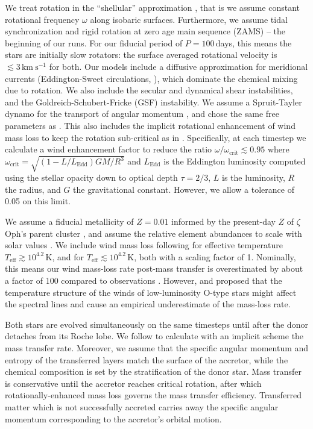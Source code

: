 \documentclass[twocolumn,twocolappendix,trackchanges]{aastex63}
\newcommand{\kms}{{\mathrm{km\ s^{-1}}}}
\newcommand{\zoph}{$\zeta$ Oph}
\begin{document}
We treat rotation in the ``shellular'' approximation
\citep[e.g.,][]{zahn:92, ekstrom:12}, that is we
assume constant rotational frequency $\omega$ along isobaric
surfaces. Furthermore, we assume tidal synchronization and rigid
rotation at zero age
main sequence (ZAMS) -- the beginning of our runs. For our fiducial
period of $P=100$\,days, this means the stars are initially slow
rotators: the surface averaged rotational velocity is
$\lesssim3\,\kms$ for both. Our models include a diffusive
approximation for meridional currents (Eddington-Sweet circulations, \citealt{sweet:50}), which
dominate the chemical mixing due to rotation. We also include the
secular and dynamical shear instabilities, and the
Goldreich-Schubert-Fricke (GSF) instability.  We assume a Spruit-Tayler
dynamo for the transport of angular momentum \citep{spruit:02}, and
chose the same free parameters as \cite{heger:00}. This also includes
the implicit rotational enhancement of wind mass loss to keep the
rotation sub-critical as in \cite{langer:98}. Specifically, at each
timestep we calculate a wind enhancement factor to reduce the ratio
$\omega/\omega_\mathrm{crit}\lesssim 0.95$ where
$\omega_\mathrm{crit}=\sqrt{(1-L/L_\mathrm{Edd})GM/R^3}$ and
$L_\mathrm{Edd}$ is the Eddington luminosity computed using the
stellar opacity down to optical depth
$\tau=2/3$, $L$ is the luminosity, $R$ the radius, and $G$
the gravitational constant. However, we allow a tolerance of 0.05 on
this limit.



We assume a fiducial metallicity of $Z=0.01$ informed by the
present-day $Z$ of \zoph's parent cluster \citep{murphy:21}, and assume
the relative element abundances to scale with solar values \citep{grevesse:98}. We include wind mass loss following
\cite{vink:00,vink:01} for effective
temperature $T_\mathrm{eff}\gtrsim10^{4.2}$\,K, and \cite{dejager:88} for  $T_\mathrm{eff}\lesssim10^{4.2}$\,K, both with a scaling
factor of 1. Nominally, this means our wind mass-loss rate post-mass
transfer is overestimated by about a factor of 100 compared to
observations \citep[weak wind problem, see][]{marcolino:09}.  However,
\cite{lucy:12} and \cite{lagae:21} proposed that the temperature
structure of the winds of low-luminosity O-type stars might affect the
spectral lines and cause an empirical underestimate of the mass-loss
rate.

Both stars are evolved simultaneously on the same timesteps until
after the donor detaches from its Roche lobe. We follow \cite{kolb:90}
to calculate with an implicit scheme the mass transfer rate. Moreover, we
assume that the specific angular momentum and entropy of the
transferred layers match the surface of the accretor, while the chemical composition
is set by the stratification of the donor star. Mass transfer is
conservative until the accretor reaches critical rotation, after which
rotationally-enhanced mass loss governs the mass transfer efficiency.
Transferred matter which is not successfully accreted carries away the
specific angular momentum corresponding to the accretor's orbital
motion.
\end{document}
